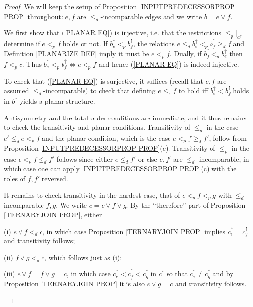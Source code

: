 \documentclass[a4paper,10pt]{article}%
\begin{document}
\begin{proof}
  We will keep the setup of Proposition \ref{INPUTPREDECESSORPROP PROP} throughout: $e, f$ are $\leq_d$-incomparable edges and we write $b = e \vee f$. 

  We first show that (\ref{PLANAR EQ}) is injective, i.e. that the restrictions $\leq_p|_{a^{\uparrow}}$ determine if 
  $e <_p f$ holds or not.
  If $b^{\uparrow}_e <_p b^{\uparrow}_f$, the relations
  $e \leq_d b^{\uparrow}_e <_p b^{\uparrow}_f \geq_d f$
  and Definition \ref{PLANARIZE DEF} imply it must be $e <_p f$.
  Dually, if $b^{\uparrow}_f <_p b^{\uparrow}_e$ then 
  $f <_p e$. Thus 
  $b^{\uparrow}_e <_p b^{\uparrow}_f \Leftrightarrow e <_p f$ and hence (\ref{PLANAR EQ}) is indeed injective.

  To check that (\ref{PLANAR EQ}) is surjective, it suffices (recall that $e,f$ are assumed $\leq_d$-incomparable) to check that
  defining $e \leq_p f$ to hold iff $b^{\uparrow}_e < b^{\uparrow}_f$ holds in $b^{\uparrow}$ yields a planar structure.

  Antisymmetry and the total order conditions are immediate, and it thus remains to check the transitivity and planar conditions.
  Transitivity of $\leq_p$ in the case $e' \leq_d e <_p f$ and the planar condition, which is the case $e <_p f \geq_d f'$, follow from Proposition \ref{INPUTPREDECESSORPROP PROP}(c). Transitivity of $\leq_p$ in the case $e <_p f \leq_d f'$
  follows since either $e \leq_d f'$ or else $e,f'$ are $\leq_d$-incomparable, in which case one can apply \ref{INPUTPREDECESSORPROP PROP}(c) with the roles of $f,f'$ reversed.

  It remains to check transitivity in the hardest case, that of 
  $e <_p f <_p g$ with $\leq_d$-incomparable $f,g$.
  We write $c = e \vee f \vee g$.
  By the ``therefore'' part of Proposition \ref{TERNARYJOIN PROP}, either
  \begin{inparaenum}
  \item[(i)] $e \vee f <_d c$, in which case 
    Proposition \ref{TERNARYJOIN PROP}
    implies 
    $c^{\uparrow}_e = c^{\uparrow}_f$ and transitivity follows;
  \item[(ii)] $f \vee g <_d c$, which follows just as (i);
  \item[(iii)]  
    $e \vee f = f \vee g =c$, in which case 
    $c^{\uparrow}_e <
    c^{\uparrow}_f <
    c^{\uparrow}_g $ in $c^{\uparrow}$
    so that $c^{\uparrow}_e \neq c^{\uparrow}_g$ and by Proposition \ref{TERNARYJOIN PROP} it is also 
    $e \vee g = c$ and transitivity follows.
  \end{inparaenum}
\end{proof}
\end{document}
